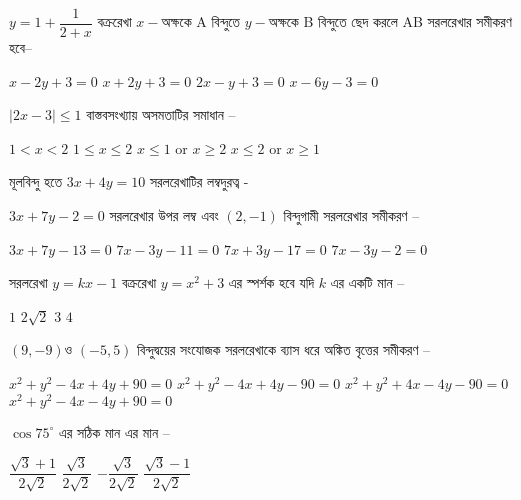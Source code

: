 \documentclass[addpoints]{exam}
\begin{document}
\begin{questions}
\question $ y = 1 +\dfrac{1}{2+x} $ বক্ররেখা $ x-$অক্ষকে A বিন্দুতে $ y-$অক্ষকে B বিন্দুতে ছেদ করলে AB সরলরেখার সমীকরণ  হবে–

\begin{oneparchoices}
\choice $ x-2y+3=0 $
\choice $ x+2y+3=0 $
\choice $ 2x-y+3=0 $
\choice $ x-6y-3=0 $
\end{oneparchoices}

\question $ |2x-3|\le 1 $ বাস্তবসংখ্যায় অসমতাটির সমাধান – 

\begin{oneparchoices}
\choice $ 1<x<2 $
\choice $ 1\le x\le 2 $
\choice $ x\le 1 $ or $ x\ge 2 $
\choice $ x\le 2 $ or $x\ge 1$
\end{oneparchoices}

\question মূলবিন্দু হতে $ 3x+4y=10 $ সরলরেখাটির লম্বদুরত্ব - 

\begin{oneparchoices}
\end{oneparchoices}

\question $ 3x+7y-2=0 $ সরলরেখার উপর লম্ব এবং $ (2,-1) $ বিন্দুগামী সরলরেখার সমীকরণ – 
 
\begin{oneparchoices}
\choice $ 3x+7y-13=0 $
\choice $ 7x-3y-11=0 $
\choice $ 7x+3y-17=0 $
\choice $ 7x-3y-2 = 0 $
\end{oneparchoices}

\question সরলরেখা $ y= kx-1 $ বক্ররেখা $ y=x^{2}+3 $ এর স্পর্শক হবে যদি $ k $ এর একটি মান – 

\begin{oneparchoices}
\choice $ 1 $
\choice $ 2\sqrt{2}$
\choice $ 3 $
\choice $ 4 $
\end{oneparchoices}

\question $ (9,-9) $ও $ (-5,5) $ বিন্দুদ্বয়ের সংযোজক সরলরেখাকে ব্যাস ধরে অঙ্কিত বৃত্তের সমীকরণ –

\begin{oneparchoices}
\choice $ x^{2}+y^{2}-4x+4y+90=0 $
\choice $ x^{2}+y^{2}-4x+4y-90=0 $
\choice $ x^{2}+y^{2}+4x-4y-90=0 $
\choice $ x^{2}+y^{2}-4x-4y+90=0 $
\end{oneparchoices}

\question $ \cos 75^{\circ} $ এর সঠিক মান
এর মান – 

\begin{oneparchoices}
\choice $ \dfrac{\sqrt{3}+1}{2\sqrt{2}} $
\choice $ \dfrac{\sqrt{3}}{2\sqrt{2}} $
\choice $ -\dfrac{\sqrt{3}}{2\sqrt{2}} $
\choice $ \dfrac{\sqrt{3}-1}{2\sqrt{2}} $
\end{oneparchoices}


\end{questions}
\end{document}
